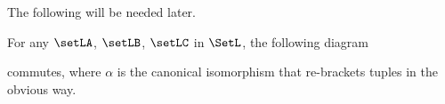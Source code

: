 The following will be needed later. 

\begin{lemma}\label{lem:coh-isos-compatible}
For any $\setLA$, $\setLB$, $\setLC$ in $\SetL$, the following diagram  
 \begin{center}
    \end{center}
commutes, where $\alpha$ is the canonical isomorphism that re-brackets tuples in the obvious way. 
\end{lemma}



